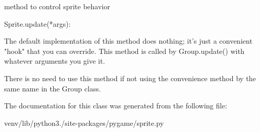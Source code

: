\begin{DoxyVerb}method to control sprite behavior

Sprite.update(*args):

The default implementation of this method does nothing; it's just a
convenient "hook" that you can override. This method is called by
Group.update() with whatever arguments you give it.

There is no need to use this method if not using the convenience
method by the same name in the Group class.\end{DoxyVerb}
 

The documentation for this class was generated from the following file\+:\begin{DoxyCompactItemize}
\item 
venv/lib/python3./site-\/packages/pygame/sprite.\+py\end{DoxyCompactItemize}
